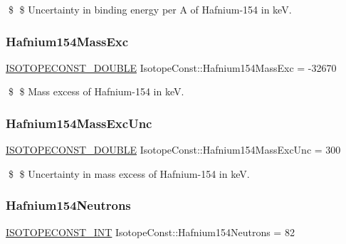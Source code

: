 \$ \$ Uncertainty in binding energy per A of Hafnium-\/154 in keV. \mbox{\label{group___isotope_const-_hafnium-_hf154_ga4f5e5ffaa2d84c6ae46f6f9660ce47fa}} 
\subsubsection{\texorpdfstring{Hafnium154\+Mass\+Exc}{Hafnium154MassExc}}
{\footnotesize\ttfamily \mbox{\hyperlink{group___isotope_const-_macros_ga8f45a7272ce02c0b4c65c44636ed719a}{I\+S\+O\+T\+O\+P\+E\+C\+O\+N\+S\+T\+\_\+\+D\+O\+U\+B\+LE}} Isotope\+Const\+::\+Hafnium154\+Mass\+Exc = -\/32670}

\$ \$ Mass excess of Hafnium-\/154 in keV. \mbox{\label{group___isotope_const-_hafnium-_hf154_ga28c119e998334f0756b303a036df3fde}} 
\subsubsection{\texorpdfstring{Hafnium154\+Mass\+Exc\+Unc}{Hafnium154MassExcUnc}}
{\footnotesize\ttfamily \mbox{\hyperlink{group___isotope_const-_macros_ga8f45a7272ce02c0b4c65c44636ed719a}{I\+S\+O\+T\+O\+P\+E\+C\+O\+N\+S\+T\+\_\+\+D\+O\+U\+B\+LE}} Isotope\+Const\+::\+Hafnium154\+Mass\+Exc\+Unc = 300}

\$ \$ Uncertainty in mass excess of Hafnium-\/154 in keV. \mbox{\label{group___isotope_const-_hafnium-_hf154_ga01a2cb8c0eceb2e4460df6d6d74174bd}} 
\subsubsection{\texorpdfstring{Hafnium154\+Neutrons}{Hafnium154Neutrons}}
{\footnotesize\ttfamily \mbox{\hyperlink{group___isotope_const-_macros_ga5f18360b3e99483a35c32d789e62621c}{I\+S\+O\+T\+O\+P\+E\+C\+O\+N\+S\+T\+\_\+\+I\+NT}} Isotope\+Const\+::\+Hafnium154\+Neutrons = 82}

